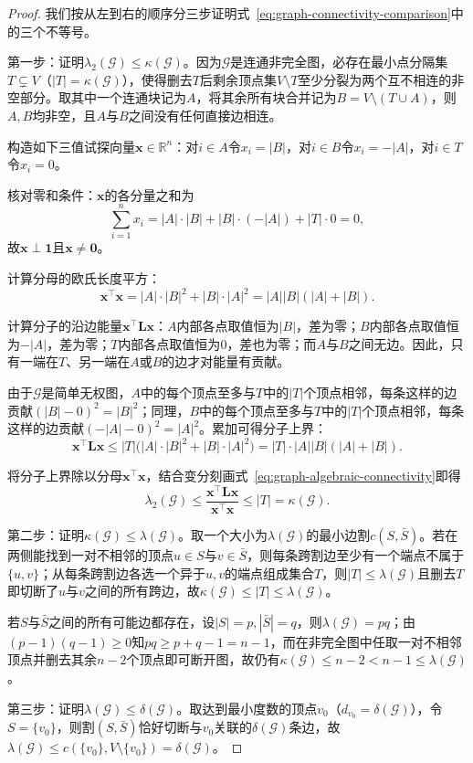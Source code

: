 \begin{proof}
我们按从左到右的顺序分三步证明式~\eqref{eq:graph-connectivity-comparison}中的三个不等号。

第一步：证明$\lambda_2(\mathcal G)\leq\kappa(\mathcal G)$。因为$\mathcal G$是连通非完全图，必存在最小点分隔集$T\subsetneq V$（$|T|=\kappa(\mathcal G)$），使得删去$T$后剩余顶点集$V\setminus T$至少分裂为两个互不相连的非空部分。取其中一个连通块记为$A$，将其余所有块合并记为$B=V\setminus(T\cup A)$，则$A,B$均非空，且$A$与$B$之间没有任何直接边相连。

构造如下三值试探向量$\bm x\in\mathbb R^n$：对$i\in A$令$x_i=|B|$，对$i\in B$令$x_i=-|A|$，对$i\in T$令$x_i=0$。

核对零和条件：$\bm x$的各分量之和为
\[
  \sum_{i=1}^n x_i = |A|\cdot|B| + |B|\cdot(-|A|) + |T|\cdot 0 = 0,
\]
故$\bm x\perp\bm 1$且$\bm x\neq\bm 0$。

计算分母的欧氏长度平方：
\[
  \bm x^\top\bm x = |A|\cdot|B|^2 + |B|\cdot|A|^2 = |A||B|(|A|+|B|).
\]

计算分子的沿边能量$\bm x^\top\bm L\bm x$：$A$内部各点取值恒为$|B|$，差为零；$B$内部各点取值恒为$-|A|$，差为零；$T$内部各点取值恒为$0$，差也为零；而$A$与$B$之间无边。因此，只有一端在$T$、另一端在$A$或$B$的边才对能量有贡献。

由于$\mathcal G$是简单无权图，$A$中的每个顶点至多与$T$中的$|T|$个顶点相邻，每条这样的边贡献$(|B|-0)^2=|B|^2$；同理，$B$中的每个顶点至多与$T$中的$|T|$个顶点相邻，每条这样的边贡献$(-|A|-0)^2=|A|^2$。累加可得分子上界：
\[
  \bm x^\top\bm L\bm x
  \leq |T|\bigl(|A|\cdot|B|^2 + |B|\cdot|A|^2\bigr)
  = |T|\cdot|A||B|(|A|+|B|).
\]

将分子上界除以分母$\bm x^\top\bm x$，结合变分刻画式~\eqref{eq:graph-algebraic-connectivity}即得
\[
  \lambda_2(\mathcal G)\leq\frac{\bm x^\top\bm L\bm x}{\bm x^\top\bm x}\leq |T|=\kappa(\mathcal G).
\]

第二步：证明$\kappa(\mathcal G)\leq\lambda(\mathcal G)$。取一个大小为$\lambda(\mathcal G)$的最小边割$c(S,\bar S)$。若在两侧能找到一对不相邻的顶点$u\in S$与$v\in\bar S$，则每条跨割边至少有一个端点不属于$\{u,v\}$；从每条跨割边各选一个异于$u,v$的端点组成集合$T$，则$|T|\leq\lambda(\mathcal G)$且删去$T$即切断了$u$与$v$之间的所有跨边，故$\kappa(\mathcal G)\leq|T|\leq\lambda(\mathcal G)$。

若$S$与$\bar S$之间的所有可能边都存在，设$|S|=p,|\bar S|=q$，则$\lambda(\mathcal G)=pq$；由$(p-1)(q-1)\geq 0$知$pq\geq p+q-1=n-1$，而在非完全图中任取一对不相邻顶点并删去其余$n-2$个顶点即可断开图，故仍有$\kappa(\mathcal G)\leq n-2<n-1\leq\lambda(\mathcal G)$。

第三步：证明$\lambda(\mathcal G)\leq\delta(\mathcal G)$。取达到最小度数的顶点$v_0$（$d_{v_0}=\delta(\mathcal G)$），令$S=\{v_0\}$，则割$(S,\bar S)$恰好切断与$v_0$关联的$\delta(\mathcal G)$条边，故$\lambda(\mathcal G)\leq c(\{v_0\},V\setminus\{v_0\})=\delta(\mathcal G)$。
\end{proof}

